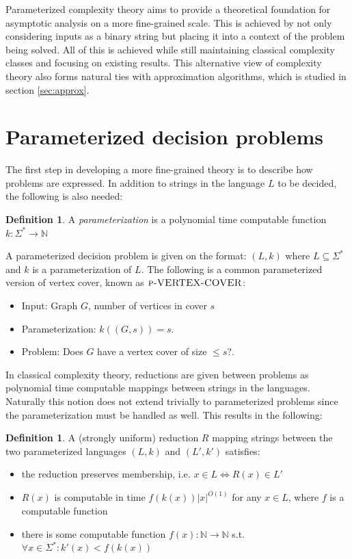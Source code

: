 \documentclass[a4paper,11pt]{report}
\theoremstyle{plain}
\theoremstyle{definition}
\newtheorem{defn}[thm]{Definition} %
\begin{document}
Parameterized complexity theory aims to provide a theoretical foundation for asymptotic analysis on a more fine-grained scale.
This is achieved by not only considering inputs as a binary string but placing it into a context of the problem being solved.
All of this is achieved while still maintaining classical complexity classes and focusing on existing results.
This alternative view of complexity theory also forms natural ties with approximation algorithms, which is studied in section \ref{sec:approx}.

\section{Parameterized decision problems}
The first step in developing a more fine-grained theory is to describe how problems are expressed.
In addition to strings in the language $L$ to be decided, the following is also needed:

\begin{defn}
A \emph{parameterization} is a polynomial time computable function $k : \Sigma^* \rightarrow \mathbb{N}$
\end{defn}

A parameterized decision problem is given on the format: $(L, k)$ where $L \subseteq \Sigma^*$ and $k$ is a parameterization of $L$.
The following is a common parameterized version of vertex cover, known as $\textsc{p-VERTEX-COVER}$:
\begin{itemize}
\item Input: Graph $G$, number of vertices in cover $s$
\item Parameterization: $k((G, s)) = s$.
\item Problem: Does $G$ have a vertex cover of size $\leq s$?.
\end{itemize}

In classical complexity theory, reductions are given between problems as polynomial time computable mappings between strings in the languages.
Naturally this notion does not extend trivially to parameterized problems since the parameterization must be handled as well.
This results in the following:

\begin{defn}
A (strongly uniform) reduction $R$ mapping strings between the two parameterized languages $(L, k)$ and $(L', k')$ satisfies:
\begin{itemize}
\item the reduction preserves membership, i.e. $x \in L \Leftrightarrow R(x) \in L'$
\item $R(x)$ is computable in time $f(k(x)) |x|^{O(1)}$ for any $x \in L$, where $f$ is a computable function
\item there is some computable function $f(x) : \mathbb{N} \rightarrow \mathbb{N}$ s.t. $\forall x \in \Sigma^* : k'(x) < f(k(x))$
\end{itemize}
\end{defn}
\end{document}
